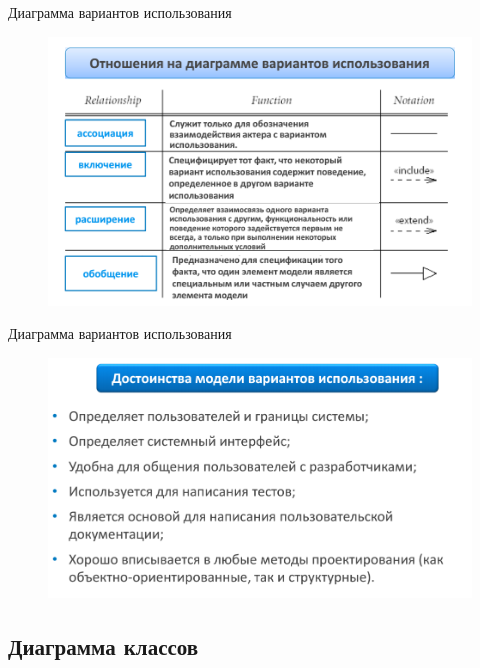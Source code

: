 \documentclass{beamer}
\begin{document}
\begin{frame}[t]{Диаграмма вариантов использования}
\begin{figure}[h]
\centering
\includegraphics[scale=0.45]{images/lec03-pic12.png}
\end{figure}
\end{frame}

\begin{frame}[t]{Диаграмма вариантов использования}
\begin{figure}[h]
\centering
\includegraphics[scale=0.45]{images/lec03-pic13.png}
\end{figure}
\end{frame}

\subsection{Диаграмма классов}
\end{document}
